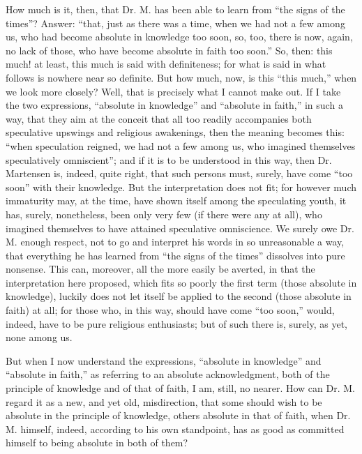 \documentclass[12pt]{book}
\begin{document}
How much is it, then, that Dr. M. has been able to learn from ``the signs of the times''? Answer: ``that, just as there was a time, when we had not a few among us, who had become absolute in knowledge too soon, so, too, there is now, again, no lack of those, who have become absolute in faith too soon.'' So, then: this much! at least, this much is said with definiteness; for what is said in what follows is nowhere near so definite. But how much, now, is this ``this much,'' when we look more closely? Well, that is precisely what I cannot make out. If I take the two expressions, ``absolute in knowledge'' and ``absolute in faith,'' in such a way, that they aim at the conceit that all too readily accompanies both speculative upswings and religious awakenings, then the meaning becomes this: ``when speculation reigned, we had not a few among us, who imagined themselves speculatively omniscient''; and if it is to be understood in this way, then Dr. Martensen is, indeed, quite right, that such persons must, surely, have come ``too soon'' with their knowledge. But the interpretation does not fit; for however much immaturity may, at the time, have shown itself among the speculating youth, it has, surely, nonetheless, been only very few (if there were any at all), who imagined themselves to have attained speculative omniscience. We surely owe Dr. M. enough respect, not to go and interpret his words in so unreasonable a way, that everything he has learned from ``the signs of the times'' dissolves into pure nonsense. This can, moreover, all the more easily be averted,
in that the interpretation here proposed, which fits so poorly the first term (those absolute in knowledge), luckily does not let itself be applied to the second (those absolute in faith) at all; for those who, in this way, should have come ``too soon,'' would, indeed, have to be pure religious enthusiasts; but of such there is, surely, as yet, none among us.

But when I now understand the expressions, ``absolute in knowledge'' and ``absolute in faith,'' as referring to an absolute acknowledgment, both of the principle of knowledge and of that of faith, I am, still, no nearer. How can Dr. M. regard it as a new, and yet old, misdirection, that some should wish to be absolute in the principle of knowledge, others absolute in that of faith, when Dr. M. himself, indeed, according to his own standpoint, has as good as committed himself to being absolute in both of them?
\end{document}
